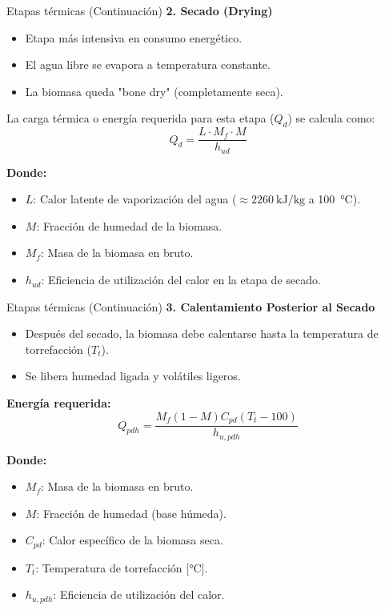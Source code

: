 \documentclass[main.tex]{subfiles}
\begin{document}
\begin{frame}{Etapas térmicas (Continuación)}
 \footnotesize
  \textbf{2. Secado (Drying)}
  \begin{itemize}
      \item Etapa más intensiva en consumo energético.
      \item El agua libre se evapora a temperatura constante.
      \item La biomasa queda "bone dry" (completamente seca).
  \end{itemize}
  La carga térmica o energía requerida para esta etapa ($Q_d$) se calcula como:
  \[
  Q_d = \frac{L \cdot M_f \cdot M}{h_{ud}}
  \]
  
  \textbf{Donde:}
  \begin{itemize}
    \item $L$: Calor latente de vaporización del agua ($\approx \SI{2260}{\kilo\joule\per\kilogram}$ a \SI{100}{\celsius}).
    \item $M$: Fracción de humedad de la biomasa.
    \item $M_f$: Masa de la biomasa en bruto.
    \item $h_{ud}$: Eficiencia de utilización del calor en la etapa de secado.
  \end{itemize}
\end{frame}
 
\begin{frame}{Etapas térmicas (Continuación)}
 \footnotesize
  \textbf {3. Calentamiento Posterior al Secado}
  \begin{itemize}
      \item Después del secado, la biomasa debe calentarse hasta la temperatura de torrefacción ($T_t$).
      \item Se libera humedad ligada y volátiles ligeros.
  \end{itemize}
  \textbf{Energía requerida:}
  \[
  Q_{pdh} = \frac{M_f (1 - M) C_{pd} (T_t - 100)}{h_{u,pdh}}
  \]

  \textbf{Donde:}
  \begin{itemize}
    \item $M_f$: Masa de la biomasa en bruto.
    \item $M$: Fracción de humedad (base húmeda).
    \item $C_{pd}$: Calor específico de la biomasa seca.
    \item $T_t$: Temperatura de torrefacción [\si{\celsius}].
    \item $h_{u,pdh}$: Eficiencia de utilización del calor.
  \end{itemize}
\end{frame}
\end{document}
